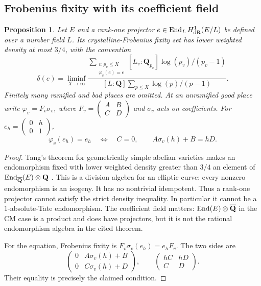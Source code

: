 \documentclass[11pt]{article}
\newtheorem{proposition}[theorem]{Proposition}
\theoremstyle{definition}\newtheorem{definition}[theorem]{Definition}
\theoremstyle{remark}\newtheorem{remark}[theorem]{Remark}
\newcommand{\Q}{\mathbf Q}\newcommand{\Z}{\mathbf Z}
\newcommand{\Qb}{\overline{\mathbf Q}}\newcommand{\Fp}{\mathbf F_p}
\begin{document}
\subsection{Frobenius fixity with its coefficient field}
\begin{proposition}\label{prop:projector-frobenius-density}
Let $E$ and a rank-one projector $e\in\operatorname{End}_LH^1_{\mathrm{dR}}(E/L)$ be defined over a number field $L$. Its crystalline-Frobenius fixity set has lower weighted density at most $3/4$, with the convention
\[
 \underline\delta(e)=\liminf_{X\to\infty}
 \frac{\displaystyle\sum_{\substack{v:p_v\le X\\\varphi_v(e)=e}}
          [L_v:\Q_{p_v}]\log(p_v)/(p_v-1)}
 {[L:\Q]\displaystyle\sum_{p\le X}\log(p)/(p-1)}.
\]
Finitely many ramified and bad places are omitted. At an unramified good place write $\varphi_v=F_v\sigma_v$, where
$F_v=\left(\begin{smallmatrix}A&B\\C&D\end{smallmatrix}\right)$ and $\sigma_v$ acts on coefficients. For $e_h=\left(\begin{smallmatrix}0&h\\0&1\end{smallmatrix}\right)$,
\[
 \varphi_v(e_h)=e_h
 \quad\Longleftrightarrow\quad C=0,\qquad A\sigma_v(h)+B=hD.
\]
\end{proposition}
\begin{proof}
Tang's theorem for geometrically simple abelian varieties makes an endomorphism fixed with lower weighted density greater than $3/4$ an element of $\End_{\Qb}(E)\otimes\Q$ \cite[Definition 2.3.1, p.~7; Corollary 5.2.3, p.~23]{Tang}. This is a division algebra for an elliptic curve: every nonzero endomorphism is an isogeny. It has no nontrivial idempotent. Thus a rank-one projector cannot satisfy the strict density inequality. In particular it cannot be a $1$-absolute-Tate endomorphism. The coefficient field matters: $\End(E)\otimes\Qb$ in the CM case is a product and does have projectors, but it is not the rational endomorphism algebra in the cited theorem.

For the equation, Frobenius fixity is $F_v\sigma_v(e_h)=e_hF_v$. The two sides are
\[
 \begin{pmatrix}0&A\sigma_v(h)+B\\0&C\sigma_v(h)+D\end{pmatrix},
 \qquad
 \begin{pmatrix}hC&hD\\C&D\end{pmatrix}.
\]
Their equality is precisely the claimed condition.
\end{proof}
\end{document}
